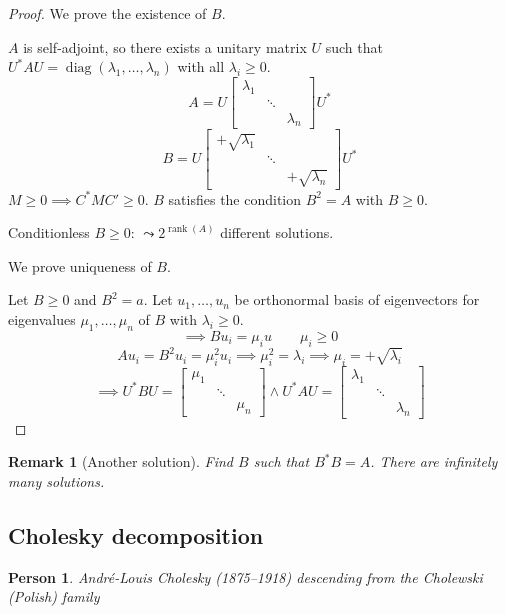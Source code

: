 \documentclass[a4paper]{article}
\numberwithin{lecref}{section}
\newtheorem*{Remark}{Remark}
\newtheorem*{Person}{Person}
\DeclareMathOperator{\rank}{rank}
\begin{document}
\begin{proof}
  We prove the existence of $B$.

  $A$ is self-adjoint, so there exists a unitary matrix $U$ such that $U^* AU = \operatorname{diag}(\lambda_1, \dots, \lambda_n)$
  with all $\lambda_i \geq 0$.
  \[ A = U \begin{bmatrix} \lambda_1 & & \\ & \ddots & \\ & & \lambda_n \end{bmatrix} U^* \]
  \[ B = U \begin{bmatrix} +\sqrt{\lambda_1} & & \\ & \ddots & \\ & & +\sqrt{\lambda_n} \end{bmatrix} U^* \]
  $M \geq 0 \implies C^* MC' \geq 0$.
  $B$ satisfies the condition $B^2 = A$ with $B \geq 0$.

  Conditionless $B \geq 0$: $\leadsto 2^{\rank(A)}$ different solutions.

  We prove uniqueness of $B$.

  Let $B \geq 0$ and $B^2 = a$.
  Let $u_1, \dots, u_n$ be orthonormal basis of eigenvectors for eigenvalues $\mu_1, \dots, \mu_n$ of $B$ with $\lambda_i \geq 0$.
  \[ \implies Bu_i = \mu_i u \qquad \mu_i \geq 0 \]
  \[ Au_i = B^2 u_i = \mu_i^2 u_i \implies \mu_i^2 = \lambda_i \implies \mu_i = +\sqrt{\lambda_i} \]
  \[
    \implies U^* BU = \begin{bmatrix} \mu_1 & & \\ & \ddots & \\ & & \mu_n \end{bmatrix}
    \land    U^* AU = \begin{bmatrix} \lambda_1 & & \\ & \ddots & \\ & & \lambda_n \end{bmatrix}
  \]
\end{proof}

\begin{Remark}[Another solution]
  Find $B$ such that $B^* B = A$. There are infinitely many solutions.
\end{Remark}

\subsection{Cholesky decomposition}

\begin{Person}
  Andr\'e-Louis Cholesky (1875--1918) descending from the Cholewski (Polish) family
\end{Person}
\end{document}
